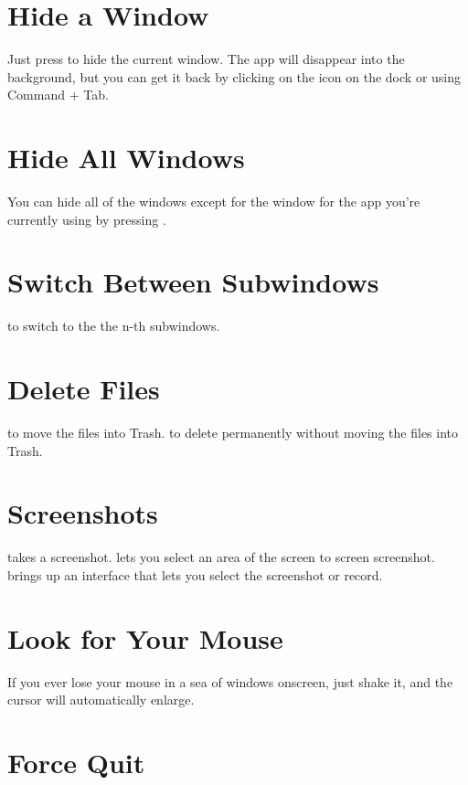 \section{Hide a Window}

Just press  to hide the current window.
The app will disappear into the background, but you can get it back by clicking on the icon on the dock or using Command + Tab.

\section{Hide All Windows}

You can hide all of the windows except for the window for the app you're currently using by pressing .

\section{Switch Between Subwindows}

 to switch to the the n-th subwindows.

\section{Delete Files}

 to move the files into Trash.
 to delete permanently without moving the files into Trash.


\section{Screenshots}

 takes a screenshot.
 lets you select an area of the screen to screen screenshot.
 brings up an interface that lets you select the screenshot or record.

\section{Look for Your Mouse}

If you ever lose your mouse in a sea of windows onscreen, just shake it, and the cursor will automatically enlarge.


\section{Force Quit}

